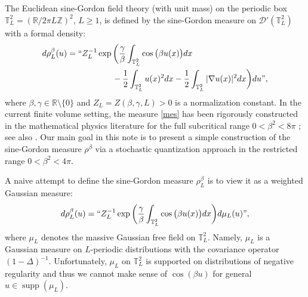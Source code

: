 \documentclass[letterpaper, 11pt,  reqno]{amsart}
\theoremstyle{myremark}
\DeclareMathOperator*{\supp}{supp}
\newcommand{\1}{\hspace{0.5mm}\text{I}\hspace{0.5mm}}
\newcommand{\Z}{\mathbb{Z}}
\newcommand{\R}{\mathbb{R}}
\newcommand{\T}{\mathbb{T}}
\newcommand{\D}{\mathcal{D}}
\newcommand{\be}{\beta}
\newcommand{\Dl}{\Delta}
\newcommand{\g}{\gamma}
\numberwithin{equation}{section}
\numberwithin{theorem}{section}
\begin{document}
The Euclidean sine-Gordon field theory (with unit mass) on the periodic box
 $\T_L^2 = (\R/2\pi L\Z)^2$, $L\ge 1$, 
is defined by 
the  sine-Gordon measure on 
$\D'(\T_L^2)$ with a  formal density:
\begin{align}
\begin{split}
d\rho_L^\be(u) & =``Z_L^{-1} \exp \bigg( \frac\g\be \int_{\T_L^2}\cos\big(\be u(x)\big)dx \\
& \hphantom{XXXXXX}
- \frac12 \int_{\T_L^2} u(x)^2 dx -  \frac12\int_{\T_L^2}|\nabla u(x)|^2dx \bigg) du",
\end{split}
\label{mes}
\end{align}
where 
$\be, \g \in \R\setminus \{0\}$
and $ Z_L =  Z(\be, \g,L) > 0$ is a normalization constant.
 In the current finite volume setting, the measure \eqref{mes} has been rigorously constructed in the mathematical physics literature for the full subcritical range $0 < \be^2 < 8\pi$ \cite{DH1, DH2, DH3};
 see also \cite{Fro, FP, BB}.
Our main goal in this  note is to present 
a simple construction of the sine-Gordon measure $\rho^\be$
via a stochastic quantization approach 
in the restricted range $0 < \be^2 < 4\pi$.






A  naive attempt 
to define the sine-Gordon measure $\rho^\be_L$ 
is to view it as a weighted Gaussian measure:
 \begin{align*}
 d \rho^\be_L(u) = ``  Z_L^{-1}  \exp \bigg( \frac\g\be \int_{\T^2_L}\cos\big(\be u(x)\big)dx \bigg) d\mu_L(u)", 
 \end{align*} 
where $\mu_L$ denotes the massive Gaussian free field on $\T^2_L$.
Namely, $\mu_L$ is a Gaussian measure on $L$-periodic distributions 
with the covariance operator $(1-\Dl)^{-1}$.
Unfortunately, $\mu_L$ on $\T^2_L$ is supported on 
distributions of negative regularity  \cite{GF}
and  thus we cannot make sense of $\cos (\be u)$ %
for  general $u \in \supp(\mu_L)$.
\end{document}

